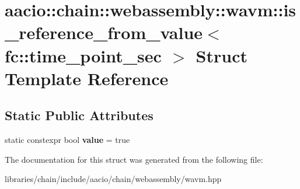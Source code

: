 \hypertarget{structaacio_1_1chain_1_1webassembly_1_1wavm_1_1is__reference__from__value_3_01fc_1_1time__point__sec_01_4}{}\section{aacio\+:\+:chain\+:\+:webassembly\+:\+:wavm\+:\+:is\+\_\+reference\+\_\+from\+\_\+value$<$ fc\+:\+:time\+\_\+point\+\_\+sec $>$ Struct Template Reference}
\label{structaacio_1_1chain_1_1webassembly_1_1wavm_1_1is__reference__from__value_3_01fc_1_1time__point__sec_01_4}
\subsection*{Static Public Attributes}
\begin{DoxyCompactItemize}
\item 
\mbox{\label{structaacio_1_1chain_1_1webassembly_1_1wavm_1_1is__reference__from__value_3_01fc_1_1time__point__sec_01_4_a5f46676084033013204b100db31542bc}} 
static constexpr bool {\bfseries value} = true
\end{DoxyCompactItemize}


The documentation for this struct was generated from the following file\+:\begin{DoxyCompactItemize}
\item 
libraries/chain/include/aacio/chain/webassembly/wavm.\+hpp\end{DoxyCompactItemize}
